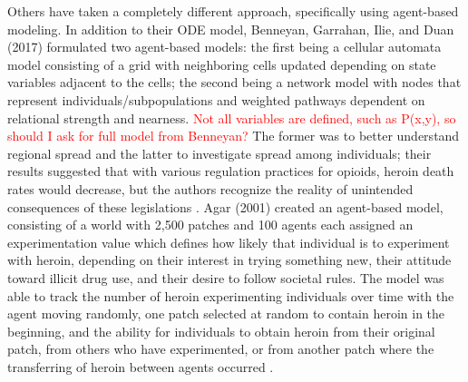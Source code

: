 \documentclass[12pt]{article}
\begin{document}
Others have taken a completely different approach, specifically using agent-based modeling. In addition to their ODE model, Benneyan, Garrahan, Ilie, and Duan (2017) formulated two agent-based models: the first being a cellular automata model consisting of a grid with neighboring cells updated depending on state variables adjacent to the cells; the second being a network model with nodes that represent individuals/subpopulations and weighted pathways dependent on relational strength and nearness. \textcolor{red}{Not all variables are defined, such as P(x,y), so should I ask for full model from Benneyan?} The former was to better understand regional spread and the latter to investigate spread among individuals; their results suggested that with various regulation practices for opioids, heroin death rates would decrease, but the authors recognize the reality of unintended consequences of these legislations \cite{Benneyan}. Agar (2001) created an agent-based model, consisting of a world with 2,500 patches and 100 agents each assigned an experimentation value which defines how likely that individual is to experiment with heroin, depending on their interest in trying something new, their attitude toward illicit drug use, and their desire to follow societal rules. The model was able to track the number of heroin experimenting individuals over time with the agent moving randomly, one patch selected at random to contain heroin in the beginning, and the ability for individuals to obtain heroin from their original patch, from others who have experimented, or from another patch where the transferring of heroin between agents occurred \cite{Agar}.
\end{document}
